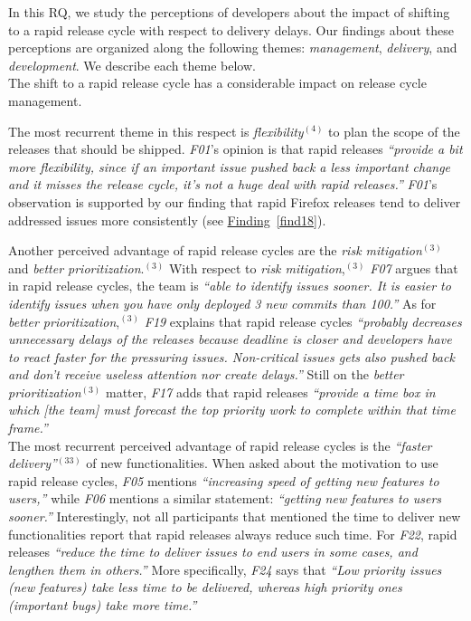 In this RQ, we study the perceptions of developers about the impact of shifting
to a rapid release cycle with respect to delivery delays. Our findings about
these perceptions are organized along the following themes: {\em management},
{\em delivery}, and {\em development}. We describe each theme below.\\    

\noindent{} The shift to a rapid
release cycle has a considerable impact on release cycle management. 

The most recurrent theme in this respect is {\em flexibility}$^{(4)}$ to plan
the scope of the releases that should be shipped.  {\em F01}'s opinion is that
rapid releases {\em ``provide a bit more flexibility, since if an important
issue pushed back a less important change and it misses the release cycle, it's
not a huge deal with rapid releases.''} {\em F01}'s observation is supported by
our finding that rapid Firefox releases tend to deliver addressed issues
more consistently (see \hyperref[find18]{Finding}~\ref{find18}). 

Another perceived advantage of rapid release cycles are the {\em risk
mitigation}$^{(3)}$ and {\em better prioritization}.$^{(3)}$ With respect to
{\em risk mitigation},$^{(3)}$ {\em F07} argues that in rapid release cycles,
the team is {\em ``able to identify issues sooner. It is easier to identify
issues when you have only deployed 3 new commits than 100.''} As for {\em better
prioritization},$^{(3)}$ {\em F19} explains that rapid release cycles {\em
``probably decreases unnecessary delays of the releases because deadline is
closer and developers have to react faster for the pressuring issues.
Non-critical issues gets also pushed back and don't receive useless attention
nor create delays.''} Still on the {\em better prioritization}$^{(3)}$ matter,
{\em F17} adds that rapid releases {\em ``provide a time box in which [the team]
must forecast the top priority work to complete within that time frame.'' }\\

\noindent{} The most recurrent perceived
advantage of rapid release cycles is the {\em ``faster delivery''}$^{(33)}$
of new functionalities. When asked about the motivation to use rapid release
cycles, {\em F05} mentions {\em ``increasing speed of getting new features to
users,''} while {\em F06} mentions a similar statement: {\em ``getting new features to
users sooner.''} Interestingly, not all participants that mentioned the time to
deliver new functionalities report that rapid releases always reduce such time.
For {\em F22}, rapid releases {\em ``reduce the time to deliver issues to end
users in some cases, and lengthen them in others.''} More specifically, {\em F24} 
says that {\em ``Low priority issues (new features) take less
time to be delivered, whereas high priority ones (important bugs) take more
time.''} 

